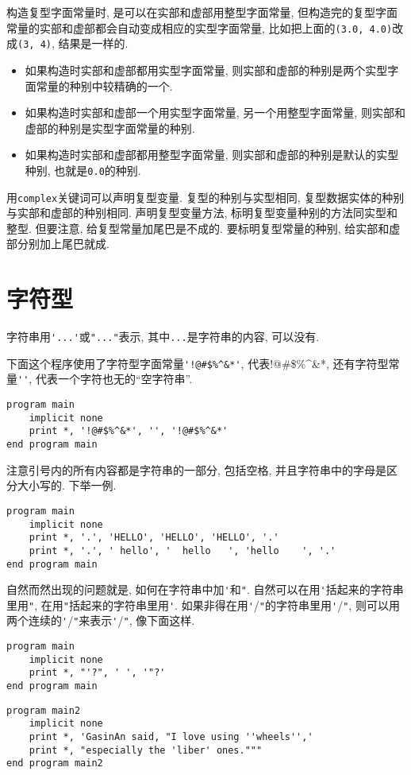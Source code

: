 构造复型字面常量时, 是可以在实部和虚部用整型字面常量, 但构造完的复型字面常量的实部和虚部都会自动变成相应的实型字面常量, 比如把上面的\verb|(3.0, 4.0)|改成\verb|(3, 4)|, 结果是一样的.
\begin{itemize}
    \item 如果构造时实部和虚部都用实型字面常量, 则实部和虚部的种别是两个实型字面常量的种别中较精确的一个.
    \item 如果构造时实部和虚部一个用实型字面常量, 另一个用整型字面常量, 则实部和虚部的种别是实型字面常量的种别.
    \item 如果构造时实部和虚部都用整型字面常量, 则实部和虚部的种别是默认的实型种别, 也就是\verb|0.0|的种别.
\end{itemize}

用\verb|complex|关键词可以声明复型变量. 复型的种别与实型相同, 复型数据实体的种别与实部和虚部的种别相同. 声明复型变量方法, 标明复型变量种别的方法同实型和整型. 但要注意, 给复型常量加尾巴是不成的. 要标明复型常量的种别, 给实部和虚部分别加上尾巴就成.

\section{字符型}\label{fortran_char}

字符串用\verb|'...'|或\verb|"..."|表示, 其中\verb|...|是字符串的内容, 可以没有.

下面这个程序使用了字符型字面常量\verb|'!@#$%^&*'|, 代表!@\#\$\%\^{}\&*, 还有字符型常量\verb|''|, 代表一个字符也无的``空字符串''.
\begin{verbatim}
program main
    implicit none
    print *, '!@#$%^&*', '', '!@#$%^&*'
end program main
\end{verbatim}

注意引号内的所有内容都是字符串的一部分, 包括空格, 并且字符串中的字母是区分大小写的. 下举一例.
\begin{verbatim}
program main
    implicit none
    print *, '.', 'HELLO', 'HELLO', 'HELLO', '.'
    print *, '.', ' hello', '  hello   ', 'hello    ', '.'
end program main
\end{verbatim}

自然而然出现的问题就是, 如何在字符串中加\verb|'|和\verb|"|. 自然可以在用\verb|'|括起来的字符串里用\verb|"|, 在用\verb|"|括起来的字符串里用\verb|'|. 如果非得在用\verb|'|/\verb|"|的字符串里用\verb|'|/\verb|"|, 则可以用两个连续的\verb|'|/\verb|"|来表示\verb|'|/\verb|"|, 像下面这样.
\begin{verbatim}
program main
    implicit none
    print *, "'?", ' ', '"?'
end program main
\end{verbatim}
\begin{verbatim}
program main2
    implicit none
    print *, 'GasinAn said, "I love using ''wheels'','
    print *, "especially the 'liber' ones."""
end program main2
\end{verbatim}

